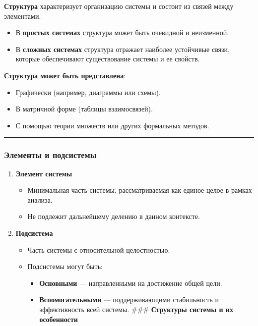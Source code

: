 \documentclass[
]{article}
\providecommand{\tightlist}{%
  \setlength{\itemsep}{0pt}\setlength{\parskip}{0pt}}
\begin{document}
\textbf{Структура} характеризует организацию системы и состоит из связей
между элементами.

\begin{itemize}
\tightlist
\item
  В \textbf{простых системах} структура может быть очевидной и
  неизменной.
\item
  В \textbf{сложных системах} структура отражает наиболее устойчивые
  связи, которые обеспечивают существование системы и ее свойств.
\end{itemize}

\textbf{Структура может быть представлена}:

\begin{itemize}
\tightlist
\item
  Графически (например, диаграммы или схемы).
\item
  В матричной форме (таблицы взаимосвязей).
\item
  С помощью теории множеств или других формальных методов.
\end{itemize}

\begin{center}\rule{0.5\linewidth}{0.5pt}\end{center}

\subsubsection{\texorpdfstring{\textbf{Элементы и
подсистемы}}{Элементы и подсистемы}}\label{ux44dux43bux435ux43cux435ux43dux442ux44b-ux438-ux43fux43eux434ux441ux438ux441ux442ux435ux43cux44b}

\begin{enumerate}
\def\labelenumi{\arabic{enumi}.}
\item
  \textbf{Элемент системы}

  \begin{itemize}
  \tightlist
  \item
    Минимальная часть системы, рассматриваемая как единое целое в рамках
    анализа.
  \item
    Не подлежит дальнейшему делению в данном контексте.
  \end{itemize}
\item
  \textbf{Подсистема}

  \begin{itemize}
  \tightlist
  \item
    Часть системы с относительной целостностью.
  \item
    Подсистемы могут быть:

    \begin{itemize}
    \tightlist
    \item
      \textbf{Основными} --- направленными на достижение общей цели.
    \item
      \textbf{Вспомогательными} --- поддерживающими стабильность и
      эффективность всей системы. \#\#\# \textbf{Структуры системы и их
      особенности}
    \end{itemize}
  \end{itemize}
\end{enumerate}
\end{document}

